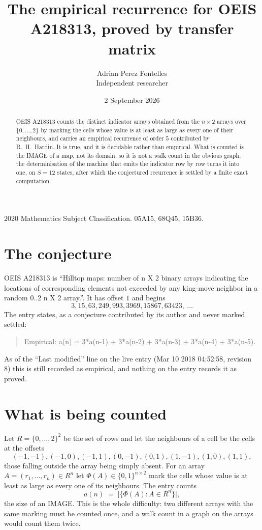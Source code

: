 \documentclass[11pt,a4paper]{article}
\title{The empirical recurrence for OEIS A218313, proved by transfer matrix}
\author{Adrian Perez Fontelles\\ \small Independent researcher}
\date{2 September 2026}
\theoremstyle{plain}
\theoremstyle{definition}
\begin{document}
\maketitle

\begin{abstract}
OEIS A218313 counts the distinct indicator arrays obtained from the $n\times2$ arrays over
$\{0,\dots,2\}$ by marking the cells whose value is at least as large as every one of their neighbours, and carries an
empirical recurrence of order $5$ contributed by R.~H.~Hardin. It is true, and it is
decidable rather than empirical. What is counted is the IMAGE of a map, not its domain, so it
is not a walk count in the obvious graph; the determinisation of the machine that emits the
indicator row by row turns it into one, on $S=12$ states, after which the conjectured
recurrence is settled by a finite exact computation.
\end{abstract}

\noindent\small 2020 Mathematics Subject Classification. 05A15, 68Q45, 15B36.\normalsize

\section{The conjecture}

OEIS A218313 is ``Hilltop maps: number of n X 2 binary arrays indicating the locations of corresponding elements not exceeded by any king-move neighbor in a random 0..2 n X 2 array.''. It has offset $1$ and begins
\[
3, 15, 63, 249, 993, 3969, 15867, 63423,\ \dots
\]
The entry states, as a conjecture contributed by its author and never marked settled:
\begin{quote}
Empirical: a(n) = 3*a(n-1) + 3*a(n-2) + 3*a(n-3) + 3*a(n-4) + 3*a(n-5).
\end{quote}
As of the ``Last modified'' line on the live entry (Mar 10 2018 04:52:58, revision 8) this is still
recorded as empirical, and nothing on the entry records it as proved.

\section{What is being counted}

Let $R=\{0,\dots,2\}^{2}$ be the set of rows and let the neighbours of a cell be the
cells at the offsets
\[
(-1,-1), (-1,0), (-1,1), (0,-1), (0,1), (1,-1), (1,0), (1,1),
\]
those falling outside the array being simply absent. For an array
$A=(r_1,\dots,r_n)\in R^n$ let $\Phi(A)\in\{0,1\}^{n\times2}$ mark the cells whose value
is at least as large as every one of its neighbours. The entry counts
\[
a(n)\;=\;\bigl|\{\Phi(A):A\in R^n\}\bigr| ,
\]
the size of an IMAGE. This is the whole difficulty: two different arrays with the same marking
must be counted once, and a walk count in a graph on the arrays would count them twice.
\end{document}
